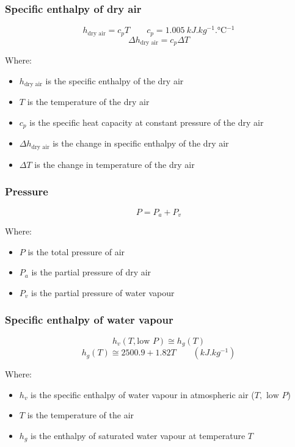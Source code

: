 \documentclass[11pt]{article}
\begin{document}
\subsubsection{Specific enthalpy of dry air}
\label{sec:org1c4b736}
\[h_{\text{dry air}} = c_p T \qquad c_p = \qty{1.005}{kJ.kg^{-1}.\degreeCelsius^{-1}}\]
\[\Delta h_{\text{dry air}} = c_p \Delta T\]

Where:
\begin{itemize}
\item \(h_{\text{dry air}}\) is the specific enthalpy of the dry air
\item \(T\) is the temperature of the dry air
\item \(c_p\) is the specific heat capacity at constant pressure of the dry air
\item \(\Delta h_{\text{dry air}}\) is the change in specific enthalpy of the dry air
\item \(\Delta T\) is the change in temperature of the dry air
\end{itemize}

\subsubsection{Pressure}
\label{sec:orgf16621f}
\[P = P_a + P_v\]

Where:
\begin{itemize}
\item \(P\) is the total pressure of air
\item \(P_a\) is the partial pressure of dry air
\item \(P_v\) is the partial pressure of water vapour
\end{itemize}

\subsubsection{Specific enthalpy of water vapour}
\label{sec:org0e57afb}
\[h_v (T, \text{low } P) \cong h_g (T)\]
\[h_g (T) \cong 2500.9 + 1.82T \qquad (\unit{kJ.kg^{-1}})\]

Where:
\begin{itemize}
\item \(h_v\) is the specific enthalpy of water vapour in atmospheric air (\(T, \text{ low } P\))
\item \(T\) is the temperature of the air
\item \(h_g\) is the enthalpy of saturated water vapour at temperature \(T\)
\end{itemize}
\end{document}
